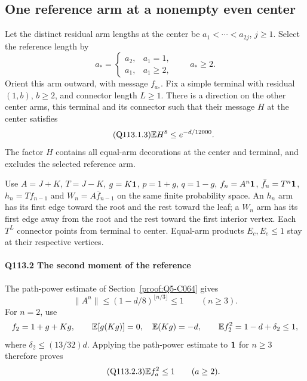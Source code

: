 \subsection{One reference arm at a nonempty even center}\label{proof:Q5-C113}
Let the distinct residual arm lengths at the center be
$a_1<\allowbreak \cdots<\allowbreak a_{2j}$, $j\ge\allowbreak 1$. Select the reference length by
\begin{equation}\tag{Q113.1.2}\label{eq:Q113:reference-selection}
 a_*=
 \begin{cases}a_2,&a_1=1,\\a_1,&a_1\ge2,\end{cases}
 \qquad a_*\ge2.
\end{equation}
Orient this arm outward, with message $f_{a_*}$.
Fix a simple terminal with residual $(1,\allowbreak b)$, $b\ge\allowbreak 2$, and connector
length $L\ge\allowbreak 1$. There is a direction on the other center arms, this
terminal and its connector such that their message $H$ at the center
satisfies
\begin{equation}\tag{Q113.1.3}\label{eq:Q113:ordinary}
 \mathbb E H^8\le e^{-d/12000}.
\end{equation}
The factor $H$ contains all equal-arm decorations at the center and
terminal, and excludes the selected reference arm.

Use $A=\allowbreak J+K$, $T=\allowbreak J-K$, $g=\allowbreak K\mathbf1$, $p=\allowbreak 1+g$, $q=\allowbreak 1-g$,
$f_n=\allowbreak A^n\mathbf1$, $\bar f_n=\allowbreak T^n\mathbf1$, $h_n=\allowbreak Tf_{n-1}$ and
$W_n=\allowbreak A\bar f_{n-1}$ on the same finite probability space.
An $h_n$ arm has its first edge toward the root and the rest toward
the leaf; a $W_n$ arm has its first edge away from the root and the
rest toward the first interior vertex. Each $T^L$ connector points
from terminal to center. Equal-arm products $E_c,\allowbreak E_e\le\allowbreak 1$ stay at
their respective vertices.

\paragraph{Q113.2 The second moment of the reference}\label{part:Q113.2}
The path-power estimate of Section~\ref{proof:Q5-C064} gives
\[
 \|A^n\|\le(1-d/8)^{\lfloor n/3\rfloor}\le1\qquad(n\ge3).
\]
For $n=\allowbreak 2$, use
\[
 f_2=1+g+Kg,\qquad \mathbb E[g(Kg)]=0,\quad \mathbb E(Kg)=-d,
 \qquad \mathbb E f_2^2=1-d+\delta_2\le1,
\]
where $\delta_2\le\allowbreak (13/32)d$. Applying the path-power estimate to
$\mathbf1$ for $n\ge\allowbreak 3$ therefore proves
\begin{equation}\tag{Q113.2.3}\label{eq:Q113:reference-second}
 \mathbb E f_a^2\le1\qquad(a\ge2).
\end{equation}

